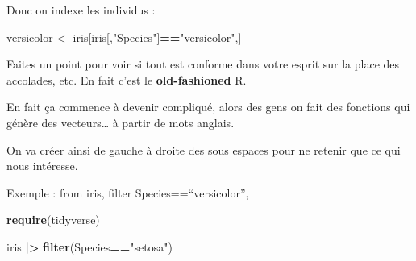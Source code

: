 \documentclass[
]{book}
\newenvironment{Shaded}{\begin{snugshade}}{\end{snugshade}}
\newcommand{\FunctionTok}[1]{\textcolor[rgb]{0.13,0.29,0.53}{\textbf{#1}}}
\newcommand{\NormalTok}[1]{#1}
\newcommand{\OtherTok}[1]{\textcolor[rgb]{0.56,0.35,0.01}{#1}}
\newcommand{\SpecialCharTok}[1]{\textcolor[rgb]{0.81,0.36,0.00}{\textbf{#1}}}
\newcommand{\StringTok}[1]{\textcolor[rgb]{0.31,0.60,0.02}{#1}}
\begin{document}
Donc on indexe les individus :

\begin{Shaded}
\begin{Highlighting}[]
\NormalTok{versicolor }\OtherTok{\textless{}{-}}\NormalTok{ iris[iris[,}\StringTok{"Species"}\NormalTok{]}\SpecialCharTok{==}\StringTok{"versicolor"}\NormalTok{,]}
\end{Highlighting}
\end{Shaded}

Faites un point pour voir si tout est conforme dans votre esprit sur la place
des accolades, etc. En fait c'est le \textbf{old-fashioned} R.

En fait ça commence à devenir compliqué, alors des gens on fait des fonctions
qui génère des vecteurs\ldots{} à partir de mots anglais.

On va créer ainsi de gauche à droite des sous espaces pour ne retenir que ce
qui nous intéresse.

Exemple :
from iris, filter Species==``versicolor'',

\begin{Shaded}
\begin{Highlighting}[]
\FunctionTok{require}\NormalTok{(tidyverse)}
\end{Highlighting}
\end{Shaded}

\begin{Shaded}
\begin{Highlighting}[]
\NormalTok{iris }\SpecialCharTok{|\textgreater{}} \FunctionTok{filter}\NormalTok{(Species}\SpecialCharTok{==}\StringTok{"setosa"}\NormalTok{)}
\end{Highlighting}
\end{Shaded}
\end{document}
